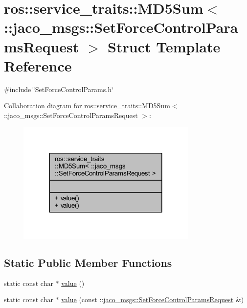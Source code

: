 \hypertarget{structros_1_1service__traits_1_1MD5Sum_3_01_1_1jaco__msgs_1_1SetForceControlParamsRequest_01_4}{}\section{ros\+:\+:service\+\_\+traits\+:\+:M\+D5\+Sum$<$ \+:\+:jaco\+\_\+msgs\+:\+:Set\+Force\+Control\+Params\+Request $>$ Struct Template Reference}
\label{structros_1_1service__traits_1_1MD5Sum_3_01_1_1jaco__msgs_1_1SetForceControlParamsRequest_01_4}


{\ttfamily \#include \char`\"{}Set\+Force\+Control\+Params.\+h\char`\"{}}



Collaboration diagram for ros\+:\+:service\+\_\+traits\+:\+:M\+D5\+Sum$<$ \+:\+:jaco\+\_\+msgs\+:\+:Set\+Force\+Control\+Params\+Request $>$\+:
\nopagebreak
\begin{figure}[H]
\begin{center}
\leavevmode
\includegraphics[width=252pt]{db/d96/structros_1_1service__traits_1_1MD5Sum_3_01_1_1jaco__msgs_1_1SetForceControlParamsRequest_01_4__coll__graph}
\end{center}
\end{figure}
\subsection*{Static Public Member Functions}
\begin{DoxyCompactItemize}
\item 
static const char $\ast$ \hyperlink{structros_1_1service__traits_1_1MD5Sum_3_01_1_1jaco__msgs_1_1SetForceControlParamsRequest_01_4_a397164727a75fc25bffd0870ad19701b}{value} ()
\item 
static const char $\ast$ \hyperlink{structros_1_1service__traits_1_1MD5Sum_3_01_1_1jaco__msgs_1_1SetForceControlParamsRequest_01_4_aa04a6278a5f0eb70c1891539d2bfd26c}{value} (const \+::\hyperlink{namespacejaco__msgs_a3486b7826c8a999135bb2eded905e7a8}{jaco\+\_\+msgs\+::\+Set\+Force\+Control\+Params\+Request} \&)
\end{DoxyCompactItemize}


